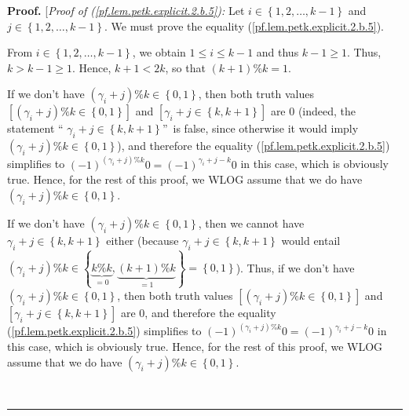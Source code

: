 \documentclass[numbers=enddot,12pt,final,onecolumn,notitlepage]{scrartcl}%
\theoremstyle{definition}
\newenvironment{proof}[1][Proof]{\noindent\textbf{#1.} }{\ \rule{0.5em}{0.5em}}
\newenvironment{verlong}{}{}
\newenvironment{vershort}{}{}
\begin{document}
\begin{proof}
[\textit{Proof of (\ref{pf.lem.petk.explicit.2.b.5}):} Let $i\in\left\{
1,2,\ldots,k-1\right\}  $ and $j\in\left\{  1,2,\ldots,k-1\right\}  $. We must
prove the equality (\ref{pf.lem.petk.explicit.2.b.5}).

From $i\in\left\{  1,2,\ldots,k-1\right\}  $, we obtain $1\leq i\leq k-1$ and
thus $k-1\geq1$. Thus, $k>k-1\geq1$. Hence, $k+1<2k$, so that $\left(
k+1\right)  \%k=1$.

\begin{vershort}
If we don't have $\left(  \gamma_{i}+j\right)  \%k\in\left\{  0,1\right\}  $,
then both truth values \newline$\left[  \left(  \gamma_{i}+j\right)
\%k\in\left\{  0,1\right\}  \right]  $ and $\left[  \gamma_{i}+j\in\left\{
k,k+1\right\}  \right]  $ are $0$ (indeed, the statement \textquotedblleft%
$\gamma_{i}+j\in\left\{  k,k+1\right\}  $\textquotedblright\ is false, since
otherwise it would imply $\left(  \gamma_{i}+j\right)  \%k\in\left\{
0,1\right\}  $), and therefore the equality (\ref{pf.lem.petk.explicit.2.b.5})
simplifies to $\left(  -1\right)  ^{\left(  \gamma_{i}+j\right)  \%k}0=\left(
-1\right)  ^{\gamma_{i}+j-k}0$ in this case, which is obviously true. Hence,
for the rest of this proof, we WLOG assume that we do have $\left(  \gamma
_{i}+j\right)  \%k\in\left\{  0,1\right\}  $.
\end{vershort}

\begin{verlong}
If we don't have $\left(  \gamma_{i}+j\right)  \%k\in\left\{  0,1\right\}  $,
then we cannot have $\gamma_{i}+j\in\left\{  k,k+1\right\}  $ either (because
$\gamma_{i}+j\in\left\{  k,k+1\right\}  $ would entail $\left(  \gamma
_{i}+j\right)  \%k\in\left\{  \underbrace{k\%k}_{=0},\underbrace{\left(
k+1\right)  \%k}_{=1}\right\}  =\left\{  0,1\right\}  $). Thus, if we don't
have $\left(  \gamma_{i}+j\right)  \%k\in\left\{  0,1\right\}  $, then both
truth values \newline$\left[  \left(  \gamma_{i}+j\right)  \%k\in\left\{
0,1\right\}  \right]  $ and $\left[  \gamma_{i}+j\in\left\{  k,k+1\right\}
\right]  $ are $0$, and therefore the equality
(\ref{pf.lem.petk.explicit.2.b.5}) simplifies to $\left(  -1\right)  ^{\left(
\gamma_{i}+j\right)  \%k}0=\left(  -1\right)  ^{\gamma_{i}+j-k}0$ in this
case, which is obviously true. Hence, for the rest of this proof, we WLOG
assume that we do have $\left(  \gamma_{i}+j\right)  \%k\in\left\{
0,1\right\}  $.
\end{verlong}


\end{proof}
\end{document}
